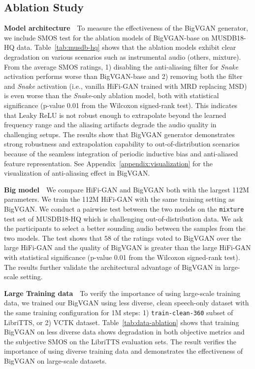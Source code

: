\documentclass{article} \usepackage{iclr2023_conference,times}
\theoremstyle{plain}
\theoremstyle{definition}
\theoremstyle{remark}
\begin{document}
\vspace{-.2cm}
\subsection{Ablation Study}
\vspace{-.1cm}
\textbf{Model architecture}~\ 
To measure the effectiveness of the BigVGAN generator, we include SMOS test for the ablation models of BigVGAN-base on MUSDB18-HQ data. Table~\ref{tab:musdb-hq} shows that the ablation models exhibit clear degradation on various  scenarios such as instrumental audio (others, mixture). From the average SMOS ratings, 1) disabling the anti-aliasing filter for \emph{Snake} activation performs worse than BigVGAN-base and 2) removing both the filter and \emph{Snake} activation (i.e., vanilla HiFi-GAN trained with MRD replacing MSD) is even worse than the \emph{Snake}-only ablation model, both with statistical significance (p-value  0.01 from the Wilcoxon signed-rank test). This indicates that Leaky ReLU is not robust enough to extrapolate beyond the learned frequency range and the aliasing artifacts degrade the audio quality in challenging setups. The results show that BigVGAN generator demonstrates strong robustness and extrapolation capability to out-of-distribution scenarios because of the seamless integration of periodic inductive bias and anti-aliased feature representation. See Appendix~\ref{appendix:visualization} for the visualization of anti-aliasing effect in BigVGAN.

\textbf{Big model}~\
We compare HiFi-GAN and BigVGAN both with the largest 112M parameters. We train the 112M HiFi-GAN with the same training setting as BigVGAN. We conduct a pairwise test between the two models on the \texttt{mixture} test set of MUSDB18-HQ which is challenging out-of-distribution data. We ask the participants to select a better sounding audio between the samples from the two models. The test shows that 58  of the ratings voted to BigVGAN over the large HiFi-GAN and the quality of BigVGAN is greater than the large HiFi-GAN with statistical significance (p-value  0.01 from the Wilcoxon signed-rank test). The results further validate the architectural advantage of BigVGAN in large-scale setting. 

\textbf{Large Training data}~\ 
To verify the importance of using large-scale training data, we trained our BigVGAN using less diverse, clean speech-only dataset with the same training configuration for 1M steps: 1) \texttt{train-clean-360} subset of LibriTTS, or 2) VCTK dataset. Table~\ref{tab:data-ablation} shows that training BigVGAN on less diverse data shows degradation in both objective metrics and the subjective SMOS on the LibriTTS evaluation sets. The result verifies the importance of using diverse training data and demonstrates the effectiveness of BigVGAN on large-scale datasets.
\end{document}
